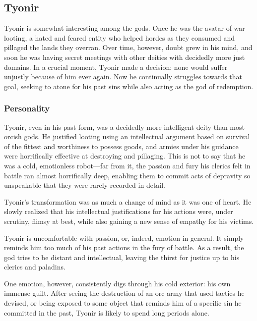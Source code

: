 \subsection*{Tyonir}
\begin{goddesc}
\end{goddesc}
Tyonir is somewhat interesting among the gods.
Once he was the avatar of war looting, a hated and feared entity who helped hordes as they consumed and pillaged the lands they overran.
Over time, however, doubt grew in his mind, and soon he was having secret meetings with other deities with decidedly more just domains. 
In a crucial moment, Tyonir made a decision: none would suffer unjustly because of him ever again.
Now he continually struggles towards that goal, seeking to atone for his past sins while also acting as the god of redemption.

\subsubsection*{Personality}
Tyonir, even in his past form, was a decidedly more intelligent deity than most orcish gods.
He justified looting using an intellectual argument based on survival of the fittest and worthiness to possess goods, and armies under his guidance were horrifically effective at destroying and pillaging.
This is not to say that he was a cold, emotionless robot---far from it, the passion and fury his clerics felt in battle ran almost horrifically deep, enabling them to commit acts of depravity so unspeakable that they were rarely recorded in detail.

Tyonir's transformation was as much a change of mind as it was one of heart.
He slowly realized that his intellectual justifications for his actions were, under scrutiny, flimsy at best, while also gaining a new sense of empathy for his victims.

Tyonir is uncomfortable with passion, or, indeed, emotion in general.
It simply reminds him too much of his past actions in the fury of battle.
As a result, the god tries to be distant and intellectual, leaving the thirst for justice up to his clerics and paladins.

One emotion, however, consistently digs through his cold exterior: his own immense guilt.
After seeing the destruction of an orc army that used tactics he devised, or being exposed to some object that reminds him of a specific sin he committed in the past, Tyonir is likely to spend long periods alone.

